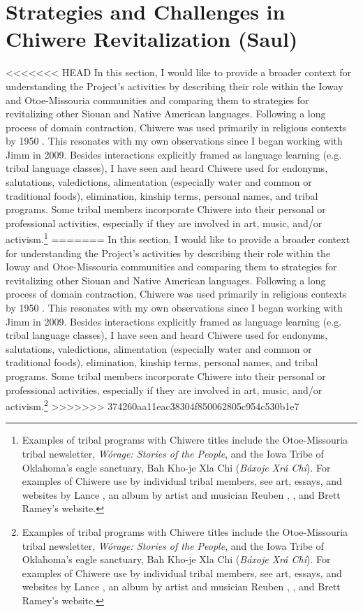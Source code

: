 \documentclass[output=paper]{LSP/langsci}
\begin{document}
\section{Strategies and Challenges in Chiwere Revitalization (Saul)}\label{saul}
<<<<<<< HEAD
In this section, I would like to provide a broader context for understanding the Project's activities by describing their role within the Ioway and Otoe-Missouria communities and comparing them to strategies for revitalizing other Siouan and Native American languages. Following a long process of domain contraction, Chiwere was used primarily in religious contexts by 1950 \citep{Davidson1997, FurbeeStanley1996, FurbeeStanley2002}. This resonates with my own observations since I began working with Jimm in 2009. Besides interactions explicitly framed as language learning (e.g. tribal language classes), I have seen and heard Chiwere used for endonyms, salutations, valedictions, alimentation (especially water and common or traditional foods), elimination, kinship terms, personal names, and tribal programs. Some tribal members incorporate Chiwere into their personal or professional activities, especially if they are involved in art, music, and/or activism.\footnote{Examples of tribal programs with Chiwere titles include the Otoe-Missouria tribal newsletter, \emph{Wórage: Stories of the People}, and the Iowa Tribe of Oklahoma's eagle sanctuary, Bah Kho-je Xla Chi (\emph{Báxoje Xrá Chí}). For examples of Chiwere use by individual tribal members, see art, essays, and websites by Lance \citet{Foster1989, Foster1996, Foster1999, Foster2009, FosterNDa, FosterNDb, FosterNDc}, an album by artist and musician Reuben \citet{Kent2004}, \citet{Jones2004}, and Brett Ramey's \citeyearpar{RameyND} website.} 
=======
In this section, I would like to provide a broader context for understanding the Project's activities by describing their role within the Ioway and Otoe-Missouria communities and comparing them to strategies for revitalizing other Siouan and Native American languages. Following a long process of domain contraction, Chiwere was used primarily in religious contexts by 1950 \citep{Davidson1997, FurbeeStanley1996, FurbeeStanley2002}. This resonates with my own observations since I began working with Jimm in 2009. Besides interactions explicitly framed as language learning (e.g. tribal language classes), I have seen and heard Chiwere used for endonyms, salutations, valedictions, alimentation (especially water and common or traditional foods), elimination, kinship terms, personal names, and tribal programs. Some tribal members incorporate Chiwere into their personal or professional activities, especially if they are involved in art, music, and/or activism.\footnote{Examples of tribal programs with Chiwere titles include the Otoe-Missouria tribal newsletter, \emph{W\'orage: Stories of the People}, and the Iowa Tribe of Oklahoma's eagle sanctuary, Bah Kho-je Xla Chi (\emph{B\'axoje Xr\'a Ch\'i}). For examples of Chiwere use by individual tribal members, see art, essays, and websites by Lance \citet{Foster1989, Foster1996, Foster1999, Foster2009, FosterNDa, FosterNDb, FosterNDc}, an album by artist and musician Reuben \citet{Kent2004}, \citet{Jones2004}, and Brett Ramey's \citeyearpar{RameyND} website.} 
>>>>>>> 374260aa11eac38304f850062805c954c530b1e7
\end{document}
